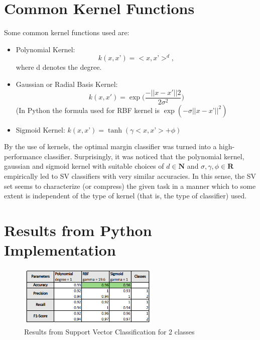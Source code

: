\documentclass{article}
\begin{document}
\section{Common Kernel Functions}
Some common kernel functions used are:
\begin{itemize}
    \item Polynomial Kernel:
    \begin{equation*}
        k(x, x’) = <x, x’>^d, 
    \end{equation*} where d denotes the degree.
    \item Gaussian or Radial Basis Kernel: 
    \begin{equation*}
        k(x, x') = \exp\Big( \frac{- ||x - x'||2}{2\sigma^2}\Big)
    \end{equation*} (In Python the formula used for RBF kernel is $\exp(- \sigma||x - x’||^2)$    
\item Sigmoid Kernel: $k(x, x’) = \tanh(\gamma <x,x’> + \phi)$
\end{itemize}
By the use of kernels, the optimal margin classifier was turned into a high-performance classifier. Surprisingly, it was noticed that the polynomial kernel, gaussian and sigmoid kernel with suitable choices of $d \in \bm{N}$ and $\sigma, \gamma, \phi \in \bm{R}$ empirically led to SV classifiers with very similar accuracies. In this sense, the SV set seems to characterize (or compress) the given task in a manner which to some extent is independent of the type of kernel (that is, the type of classifier) used.
\section{Results from Python Implementation}

\begin{figure}[h!]
  \centering
  \includegraphics[width=0.6\textwidth]{2class_table.png}
  \caption{Results from Support Vector Classification for 2 classes}
  \label{fig:fig5}
\end{figure}
\end{document}
